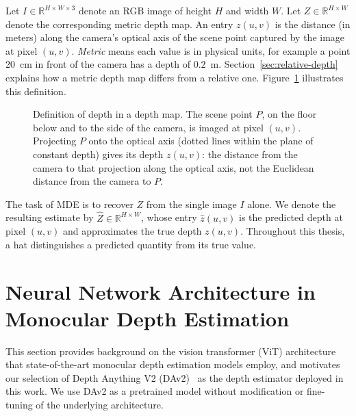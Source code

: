 Let $I \in \mathbb{R}^{H \times W \times 3}$ denote an RGB image of height $H$ and width $W$.
Let $Z \in \mathbb{R}^{H \times W}$ denote the corresponding metric depth map. An entry $z(u,v)$ 
is the distance (in meters) along the camera's optical axis of the scene point captured by the image
at pixel $(u,v)$. \emph{Metric} means each value is in physical units, for example a point
$20$~cm in front of the camera has a depth of $0.2$~m. Section~\ref{sec:relative-depth} explains
how a metric depth map differs from a relative one. Figure~\ref{fig:depth-definition} illustrates this definition.

\begin{figure}[htbp]
  \centering
  
  \caption[Definition of depth in a depth map]{Definition of depth in a depth map. The scene point
    $P$, on the floor below and to the side of the camera, is imaged at pixel $(u,v)$. Projecting
    $P$ onto the optical axis (dotted lines within the plane of constant depth) gives
    its depth $z(u,v)$: the distance from the camera to that projection along the optical axis, not
    the Euclidean distance from the camera to $P$.}
  \label{fig:depth-definition}
\end{figure}



The task of MDE is to recover $Z$ from the single image $I$ alone. We denote the
resulting estimate by $\hat{Z} \in \mathbb{R}^{H \times W}$, whose entry $\hat{z}(u,v)$
is the predicted depth at pixel $(u,v)$ and approximates the true depth $z(u,v)$.
Throughout this thesis, a hat distinguishes a predicted quantity from its true value.



\section{Neural Network Architecture in Monocular Depth Estimation}
\label{sec:vit-mde}
This section provides background on the vision transformer (ViT) architecture
that state-of-the-art monocular depth estimation models employ, and motivates our
selection of Depth Anything V2 (DAv2)~\cite{DepthAnythingV2} as the depth
estimator deployed in this work. We use DAv2 as a pretrained model
without modification or fine-tuning of the underlying architecture.


